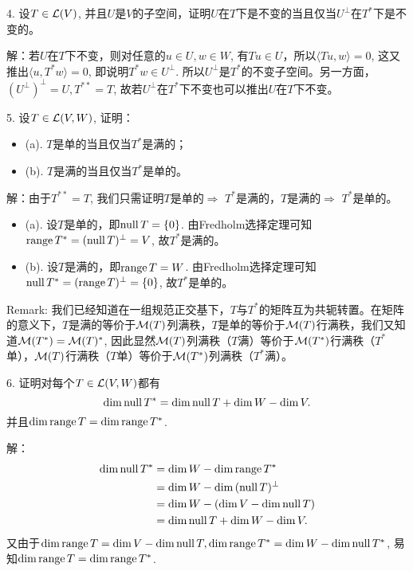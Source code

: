 \documentclass[hyperref,]{ctexart}
\providecommand{\tightlist}{%
  \setlength{\itemsep}{0pt}\setlength{\parskip}{0pt}}
\begin{document}
\bigskip

\noindent{} 4. 设\(T\in\mathcal{L}(V)\),
并且\(U\)是\(V\)的子空间，证明\(U\)在\(T\)下是不变的当且仅当\(U^\perp\)在\(T^*\)下是不变的。

\smallskip

\noindent{} 解：若\(U\)在\(T\)下不变，则对任意的\(u\in U, w\in W\),
有\(Tu\in U\)，所以\(\langle Tu,w\rangle=0\),
这又推出\(\langle u, T^*w\rangle=0\), 即说明\(T^*w\in U^\perp\).
所以\(U^\perp\)是\(T^*\)的不变子空间。另一方面，\((U^\perp)^\perp=U,T^{**}=T\),
故若\(U^\perp\)在\(T^*\)下不变也可以推出\(U\)在\(T\)下不变。

\bigskip

\noindent{} 5. 设\(T\in\mathcal{L}(V,W)\), 证明：

\begin{itemize}
\tightlist
\item
  (a). \(T\)是单的当且仅当\(T^*\)是满的；
\item
  (b). \(T\)是满的当且仅当\(T^*\)是单的。
\end{itemize}

\smallskip

\noindent{} 解：由于\(T^{**}=T\), 我们只需证明\(T\)是单的\(\Rightarrow\)
\(T^*\)是满的，\(T\)是满的\(\Rightarrow\) \(T^*\)是单的。

\begin{itemize}
\tightlist
\item
  (a). 设\(T\)是单的，即\(\mathrm{null}\, T=\{0\}\).
  由Fredholm选择定理可知\(\mathrm{range}\, T^*=(\mathrm{null}\, T)^{\perp}=V\),
  故\(T^*\)是满的。
\item
  (b). 设\(T\)是满的，即\(\mathrm{range}\, T=W\).
  由Fredholm选择定理可知\(\mathrm{null}\, T^* = (\mathrm{range}\, T)^{\perp}=\{0\}\),
  故\(T^*\)是单的。
\end{itemize}

\smallskip

\noindent{} Remark:
我们已经知道在一组规范正交基下，\(T\)与\(T^*\)的矩阵互为共轭转置。在矩阵的意义下，\(T\)是满的等价于\(\mathcal{M}(T)\)列满秩，\(T\)是单的等价于\(\mathcal{M}(T)\)行满秩，我们又知道\(\mathcal{M}(T^*)=\mathcal{M}(T)^*\),
因此显然\(\mathcal{M}(T)\)列满秩（\(T\)满）等价于\(\mathcal{M}(T^*)\)行满秩（\(T^*\)单），\(\mathcal{M}(T)\)行满秩（\(T\)单）等价于\(\mathcal{M}(T^*)\)列满秩（\(T^*\)满）。

\bigskip

\noindent{} 6. 证明对每个\(T\in\mathcal{L}(V,W)\)都有
\[\mathrm{dim}\, \mathrm{null}\, T^*=\mathrm{dim}\, \mathrm{null}\, T+\mathrm{dim}\, W-\mathrm{dim}\, V.\]
并且\(\mathrm{dim}\,\mathrm{range}\, T=\mathrm{dim}\,\mathrm{range}\, T^*\).

\smallskip

\noindent{} 解： \[\begin{aligned}
\mathrm{dim}\,\mathrm{null}\, T^* &= \mathrm{dim}\, W-\mathrm{dim}\, \mathrm{range}\, T^* \\
&= \mathrm{dim}\, W-\mathrm{dim}\, (\mathrm{null}\, T)^\perp\\
&= \mathrm{dim}\, W-(\mathrm{dim}\, V-\mathrm{dim}\,\mathrm{null}\, T)\\
&= \mathrm{dim}\, \mathrm{null}\, T+\mathrm{dim}\, W-\mathrm{dim}\, V.
\end{aligned}\]
又由于\(\mathrm{dim}\, \mathrm{range}\, T=\mathrm{dim}\, V-\mathrm{dim}\, \mathrm{null}\, T, \mathrm{dim}\, \mathrm{range}\, T^*=\mathrm{dim}\, W-\mathrm{dim}\, \mathrm{null}\, T^*\),
易知\(\mathrm{dim}\,\mathrm{range}\, T=\mathrm{dim}\,\mathrm{range}\, T^*\).
\end{document}
